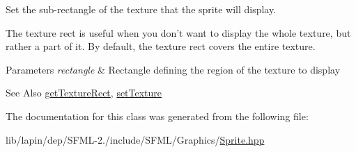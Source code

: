Set the sub-\/rectangle of the texture that the sprite will display. 

The texture rect is useful when you don't want to display the whole texture, but rather a part of it. By default, the texture rect covers the entire texture.


\begin{DoxyParams}{Parameters}
{\em rectangle} & Rectangle defining the region of the texture to display\\
\hline
\end{DoxyParams}
\begin{DoxySeeAlso}{See Also}
\hyperlink{classsf_1_1_sprite_a89aa58bc39e2072c6afe7c547d27b5a0}{get\-Texture\-Rect}, \hyperlink{classsf_1_1_sprite_a3729c88d88ac38c19317c18e87242560}{set\-Texture} 
\end{DoxySeeAlso}


The documentation for this class was generated from the following file\-:\begin{DoxyCompactItemize}
\item 
lib/lapin/dep/\-S\-F\-M\-L-\/2./include/\-S\-F\-M\-L/\-Graphics/\hyperlink{lib_2lapin_2dep_2_s_f_m_l-2_83_2include_2_s_f_m_l_2_graphics_2_sprite_8hpp}{Sprite.\-hpp}\end{DoxyCompactItemize}
